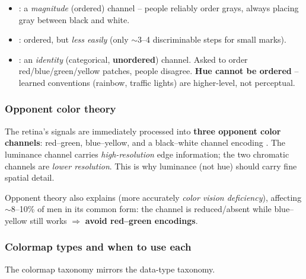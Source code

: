 \begin{keybox}
\begin{itemize}
  \item {}: a \emph{magnitude} (ordered) channel -- people
    reliably order grays, always placing gray between black and white.
  \item {}: ordered, but \emph{less easily} (only $\sim$3--4
    discriminable steps for small marks).
  \item {}: an \emph{identity} (categorical, \textbf{unordered})
    channel. Asked to order red/blue/green/yellow patches, people disagree.
    \textbf{Hue cannot be ordered} -- learned conventions (rainbow, traffic
    lights) are higher-level, not perceptual.
\end{itemize}
\end{keybox}

\subsubsection{Opponent color theory}
The retina's signals are immediately processed into \textbf{three opponent
color channels}: red--green, blue--yellow, and a black--white channel encoding
. The luminance channel carries \emph{high-resolution} edge
information; the two chromatic channels are \emph{lower resolution}. This is
why luminance (not hue) should carry fine spatial detail.

Opponent theory also explains  (more accurately
\emph{color vision deficiency}), affecting $\sim$8--10\% of men in its common
form: the  channel is reduced/absent while blue--yellow still
works $\Rightarrow$ \textbf{avoid red--green encodings}.

\subsubsection{Colormap types and when to use each}
The colormap taxonomy mirrors the data-type taxonomy.

